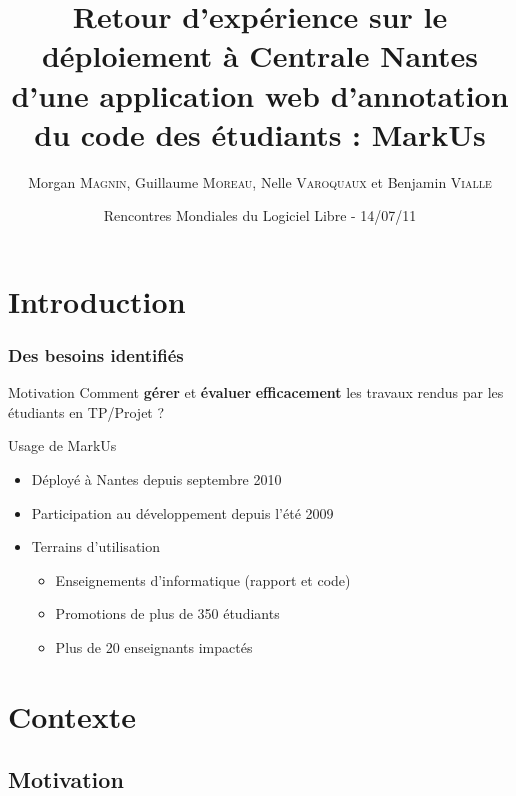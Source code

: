 \documentclass[hyperref,french,usenames,xcolor=dvipsnames]{beamer}
\title[REX MarkUs]%
{Retour d’expérience sur le déploiement à Centrale Nantes d’une application web d’annotation du code des étudiants : MarkUs}
\author[M. \textsc{Magnin}, G. \textsc{Moreau}, N. \textsc{Varoquaux}, B. \textsc{Vialle}]%
{Morgan \textsc{Magnin}, Guillaume \textsc{Moreau}, Nelle \textsc{Varoquaux} et Benjamin \textsc{Vialle}
}
\institute[ECN]{
\structure{
École Centrale de Nantes}
}
\date[14/07/2011]{Rencontres Mondiales du Logiciel Libre - 14/07/11}
\begin{document}
\frame{\titlepage}


\section*{Introduction}

\frame
{
  \frametitle{Des besoins identifiés}

\begin{alertblock}{Motivation}
Comment \textbf{gérer} et \textbf{évaluer} \textbf{efficacement} les travaux rendus par les étudiants en TP/Projet ?
\end{alertblock}

\begin{block}{Usage de MarkUs}
\begin{itemize}
\item Déployé à Nantes depuis septembre 2010
\item Participation au développement depuis l'été 2009
\item Terrains d'utilisation
\begin{itemize}
\item Enseignements d'informatique (rapport et code)
\item Promotions de plus de 350 étudiants
\item Plus de 20 enseignants impactés
\end{itemize}
\end{itemize}
\end{block}
}

\section*{Contexte}

\subsection*{Motivation}
\end{document}
